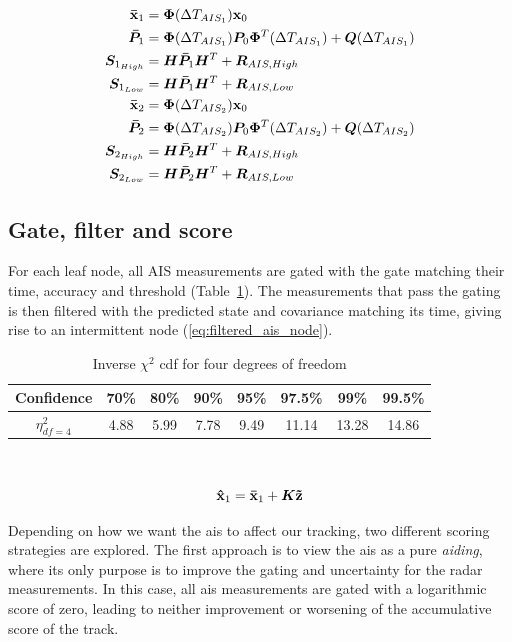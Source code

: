 \begin{equation}\label{eq:predicted_origin_state_ais_time}
\begin{split}
\boldsymbol{\mathbf{\bar{x}}}_1 	&= \bm{\Phi}(\Delta T_{AIS_1}) \boldsymbol{\mathbf{x}}_0 \\
\bm{\bar{P}}_1	&= \bm{\Phi}(\Delta T_{AIS_1}) \bm{P}_0 \bm{\Phi}^T(\Delta T_{AIS_1}) + \bm{Q}(\Delta T_{AIS_1}) \\
\bm{S}_{1_{High}}&= \bm{H} \bm{\bar{P}}_1 \bm{H}^T + \bm{R}_{AIS, High} \\
\bm{S}_{1_{Low}}	&= \bm{H} \bm{\bar{P}}_1 \bm{H}^T + \bm{R}_{AIS, Low} \\
\boldsymbol{\mathbf{\bar{x}}}_2 	&= \bm{\Phi}(\Delta T_{AIS_2}) \boldsymbol{\mathbf{x}}_0 \\
\bm{\bar{P}}_2	&= \bm{\Phi}(\Delta T_{AIS_2}) \bm{P}_0 \bm{\Phi}^T(\Delta T_{AIS_2}) + \bm{Q}(\Delta T_{AIS_2}) \\
\bm{S}_{2_{High}}&= \bm{H} \bm{\bar{P}}_2 \bm{H}^T + \bm{R}_{AIS, High} \\
\bm{S}_{2_{Low}}	&= \bm{H} \bm{\bar{P}}_2 \bm{H}^T + \bm{R}_{AIS, Low} \\
\end{split}
\end{equation}

\subsection{Gate, filter and score}\label{sec:ais_gate_filter_score}
For each leaf node, all AIS measurements are gated with the gate matching their time, accuracy and threshold (Table~\ref{tab:chi_square_4_dof}). The measurements that pass the gating is then filtered with the predicted state and covariance matching its time, giving rise to an intermittent node (\ref{eq:filtered_ais_node}).
\begin{table}
\centering
\begin{tabular}{c c c c c c c c}
Confidence 	& 70\% 	& 80\% 	& 90\% 	& 95\% 	& 97.5\% 	& 99\% 	& 99.5\% \\ 
\midrule
\(\eta^2_{df=4}\) 	& 4.88 	& 5.99 	& 7.78 	& 9.49 	& 11.14 & 13.28	& 14.86
\end{tabular}\caption{Inverse \(\chi^2\) \gls{cdf} for four degrees of freedom}
~\label{tab:chi_square_4_dof}
\end{table}
\begin{equation}\label{eq:filtered_ais_node}
\boldsymbol{\mathbf{\hat{x}}}_1 = \boldsymbol{\mathbf{\bar{x}}}_1 + \bm{K} \boldsymbol{\mathbf{\tilde{z}}}
\end{equation}

Depending on how we want the \gls{ais} to affect our tracking, two different scoring strategies are explored. The first approach is to view the \gls{ais} as a pure \emph{aiding}, where its only purpose is to improve the gating and uncertainty for the radar measurements. In this case, all \gls{ais} measurements are gated with a logarithmic score of zero, leading to neither improvement or worsening of the accumulative score of the track.

